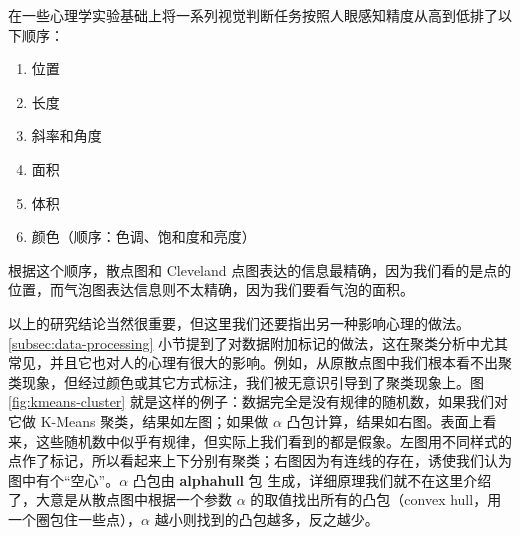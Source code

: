 \documentclass[
  b5paper,
  UTF8,twoside]{book}
\newenvironment{Shaded}{\begin{snugshade}}{\end{snugshade}}
\newcommand{\AttributeTok}[1]{\textcolor[rgb]{0.77,0.63,0.00}{#1}}
\newcommand{\DecValTok}[1]{\textcolor[rgb]{0.00,0.00,0.81}{#1}}
\newcommand{\FloatTok}[1]{\textcolor[rgb]{0.00,0.00,0.81}{#1}}
\newcommand{\FunctionTok}[1]{\textcolor[rgb]{0.00,0.00,0.00}{#1}}
\newcommand{\NormalTok}[1]{#1}
\newcommand{\OtherTok}[1]{\textcolor[rgb]{0.56,0.35,0.01}{#1}}
\newcommand{\SpecialCharTok}[1]{\textcolor[rgb]{0.00,0.00,0.00}{#1}}
\providecommand{\tightlist}{%
  \setlength{\itemsep}{0pt}\setlength{\parskip}{0pt}}
\begin{document}
\citet{Cleveland85} 在一些心理学实验基础上将一系列视觉判断任务按照人眼感知精度从高到低排了以下顺序：

\begin{enumerate}
\def\labelenumi{\arabic{enumi}.}
\tightlist
\item
  位置
\item
  长度
\item
  斜率和角度
\item
  面积
\item
  体积
\item
  颜色（顺序：色调、饱和度和亮度）
\end{enumerate}

根据这个顺序，散点图和 Cleveland 点图表达的信息最精确，因为我们看的是点的位置，而气泡图表达信息则不太精确，因为我们要看气泡的面积。

以上的研究结论当然很重要，但这里我们还要指出另一种影响心理的做法。\ref{subsec:data-processing} 小节提到了对数据附加标记的做法，这在聚类分析中尤其常见，并且它也对人的心理有很大的影响。例如，从原散点图中我们根本看不出聚类现象，但经过颜色或其它方式标注，我们被无意识引导到了聚类现象上。图 \ref{fig:kmeans-cluster} 就是这样的例子：数据完全是没有规律的随机数，如果我们对它做 K-Means 聚类，结果如左图；如果做 \(\alpha\) 凸包计算，结果如右图。表面上看来，这些随机数中似乎有规律，但实际上我们看到的都是假象。左图用不同样式的点作了标记，所以看起来上下分别有聚类；右图因为有连线的存在，诱使我们认为图中有个``空心''。\(\alpha\) 凸包由 \textbf{alphahull} 包 \citep{alphahull} 生成，详细原理我们就不在这里介绍了，大意是从散点图中根据一个参数 \(\alpha\) 的取值找出所有的凸包（convex hull，用一个圈包住一些点），\(\alpha\) 越小则找到的凸包越多，反之越少。

\begin{Shaded}
\end{Shaded}
\end{document}
